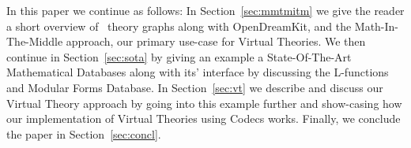 In this paper we continue as follows:
In Section~\ref{sec:mmtmitm} we give the reader a short overview of \omdocmmt\ theory graphs along with OpenDreamKit, and the Math-In-The-Middle approach, our primary use-case for Virtual Theories. 
We then continue in Section~\ref{sec:sota} by giving an example a State-Of-The-Art Mathematical Databases along with its' interface by discussing the L-functions and Modular Forms Database. 
In Section~\ref{sec:vt} we describe and discuss our Virtual Theory approach by going into this example further and show-casing how our implementation of Virtual Theories using Codecs works. 
Finally, we conclude the paper in Section~\ref{sec:concl}. 


